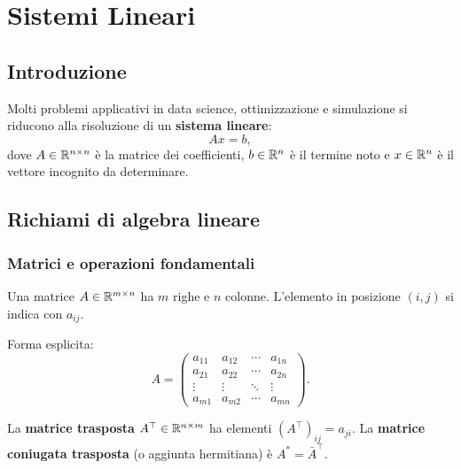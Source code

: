 \chapter{Sistemi Lineari}
\label{ch:sistemi}

\section{Introduzione}

Molti problemi applicativi in data science, ottimizzazione e simulazione si riducono
alla risoluzione di un \textbf{sistema lineare}:
\begin{equation}
  Ax = b,
  \label{eq:sistema}
\end{equation}
dove $A \in \mathbb{R}^{n \times n}$ è la matrice dei coefficienti, $b \in \mathbb{R}^n$ è il termine
noto e $x \in \mathbb{R}^n$ è il vettore incognito da determinare.

\section{Richiami di algebra lineare}

\subsection{Matrici e operazioni fondamentali}

Una matrice $A \in \mathbb{R}^{m \times n}$ ha $m$ righe e $n$ colonne. L'elemento in
posizione $(i,j)$ si indica con $a_{ij}$.

Forma esplicita:
\begin{equation}
  A =
  \begin{pmatrix}
    a_{11} & a_{12} & \cdots & a_{1n} \\
    a_{21} & a_{22} & \cdots & a_{2n} \\
    \vdots & \vdots & \ddots & \vdots \\
    a_{m1} & a_{m2} & \cdots & a_{mn}
  \end{pmatrix}.
\end{equation}

La \textbf{matrice trasposta} $A^\top \in \mathbb{R}^{n \times m}$ ha elementi $(A^\top)_{ij} = a_{ji}$.
La \textbf{matrice coniugata trasposta} (o aggiunta hermitiana) è $A^* = \bar{A}^\top$.

